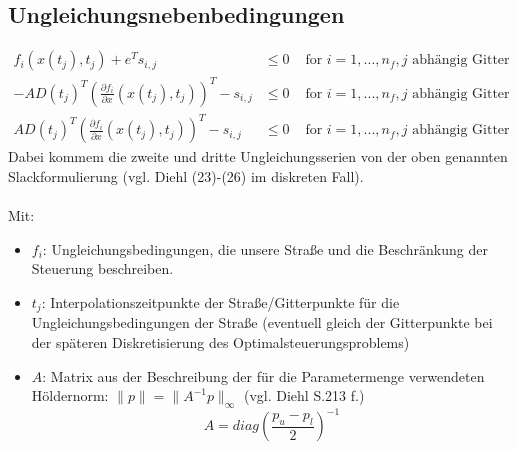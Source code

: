 \documentclass[12pt,a4paper]{article}
\theoremstyle{definition}
\theoremstyle{plain}
\begin{document}
\subsection*{Ungleichungsnebenbedingungen}
\begin{align}
f_{i}(x(t_{j}), t_{j})+e^{T}s_{i,j} &\leq 0 & \text{ for } i=1,...,n_{f}, j \text{ abhängig Gitter}\\
-AD(t_{j})^{T}\left(\frac{\partial f_{i}}{\partial x}(x(t_{j}), t_{j})\right)^{T}-s_{i,j}&\leq 0 &  \text{ for } i=1,...,n_{f}, j \text{ abhängig Gitter} \\
AD(t_{j})^{T}\left(\frac{\partial f_{i}}{\partial x}(x(t_{j}), t_{j})\right)^{T}-s_{i,j}&\leq 0 &  \text{ for } i=1,...,n_{f}, j \text{ abhängig Gitter}
\end{align}
Dabei kommem die zweite und dritte Ungleichungsserien von der oben genannten Slackformulierung (vgl. Diehl (23)-(26) im diskreten Fall).\\
\\
Mit:
\begin{itemize}
	\item $f_{i}$: Ungleichungsbedingungen, die unsere Straße und die Beschränkung der Steuerung beschreiben.
	
	\item $t_{j}$: Interpolationszeitpunkte der Straße/Gitterpunkte für die Ungleichungsbedingungen der Straße (eventuell gleich der Gitterpunkte bei der späteren Diskretisierung des Optimalsteuerungsproblems)
	
	\item $A$: Matrix aus der Beschreibung der für die Parametermenge verwendeten Höldernorm: $\| p \|=\|A^{-1}p\|_{\infty}$ (vgl. Diehl S.213 f.)
	\begin{equation*}
	A=diag\left(\frac{p_{u}-p_{l}}{2}\right)^{-1}
	\end{equation*} 
	
\end{itemize}
\end{document}
